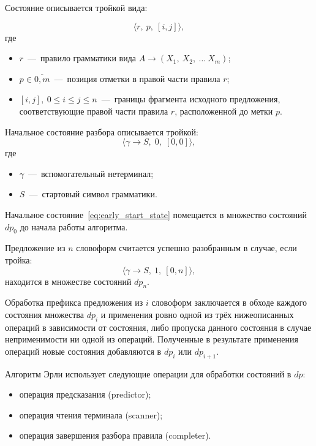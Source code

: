 Состояние описывается тройкой вида:

\begin{equation}
	\label{eq:early_state}
	\langle r,\ p,\ [i,j]\rangle,
\end{equation}
где
\begin{itemize}
	\item $r$~---~правило грамматики вида $A \rightarrow (X_1,\ X_2,\ \ldots\ X_m)$;
	\item $p \in \overline{0,m}$~---~позиция отметки в правой части правила $r$;
	\item $[i, j],\ 0\leqslant i\leqslant j \leqslant n$~---~границы фрагмента исходного предложения, соответствующие правой части правила $r$, расположенной до метки $p$.
\end{itemize}

Начальное состояние разбора описывается тройкой:
\begin{equation}
	\label{eq:early_start_state}
	\langle \gamma \rightarrow S,\; 0,\; [ 0,0]\rangle,
\end{equation}
где
\begin{itemize}
	\item $\gamma$~---~вспомогательный нетерминал;
	\item $S$~---~стартовый символ грамматики.
\end{itemize}
Начальное состояние~\ref{eq:early_start_state} помещается в множество состояний $dp_0$ до начала работы алгоритма.

Предложение из $n$ словоформ считается успешно разобранным в случае, если тройка:
\begin{equation}
	\label{eq:early_end_state}
	\langle \gamma \rightarrow S,\ 1,\ [ 0,n]\rangle,
\end{equation}
находится в множестве состояний $dp_n$.

Обработка префикса предложения из $i$ словоформ заключается в обходе каждого состояния множества $dp_i$ и применения ровно одной из трёх нижеописанных операций в зависимости от состояния, либо пропуска данного состояния в случае неприменимости ни одной из операций. Полученные в результате применения операций новые состояния добавляются в $dp_{i}$ или $dp_{i+1}$.

Алгоритм Эрли использует следующие операции для обработки состояний в $dp$:
\begin{itemize}
	\item операция предсказания (predictor);
	\item операция чтения терминала (scanner);
	\item операция завершения разбора правила (completer).
\end{itemize}

